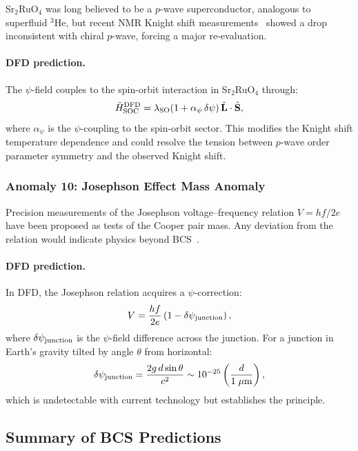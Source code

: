 \documentclass[aps,prb,twocolumn,superscriptaddress,floatfix,nofootinbib,longbibliography]{revtex4-2}
\begin{document}
Sr$_2$RuO$_4$ was long believed to be a $p$-wave superconductor,
analogous to superfluid $^3$He, but recent NMR Knight shift
measurements~\cite{Pustogow2019,Ishida2020} showed a drop inconsistent
with chiral $p$-wave, forcing a major re-evaluation.

\paragraph{DFD prediction.}
The $\psi$-field couples to the spin-orbit interaction in
Sr$_2$RuO$_4$ through:
\begin{equation}
\hat{H}_{\rm SOC}^{\rm DFD} = \lambda_{\rm SO}(1 + \alpha_\psi\,\delta\psi)
\,\hat{\mathbf{L}}\cdot\hat{\mathbf{S}},
\label{eq:sro-soc}
\end{equation}
where $\alpha_\psi$ is the $\psi$-coupling to the spin-orbit sector.
This modifies the Knight shift temperature dependence and could resolve
the tension between $p$-wave order parameter symmetry and the observed
Knight shift.

\subsubsection{Anomaly 10: Josephson Effect Mass Anomaly}

Precision measurements of the Josephson voltage--frequency relation
$V = hf/2e$ have been proposed as tests of the Cooper pair mass.  Any
deviation from the relation would indicate physics beyond
BCS~\cite{Kautz1996}.

\paragraph{DFD prediction.}
In DFD, the Josephson relation acquires a $\psi$-correction:
\begin{equation}
V = \frac{hf}{2e}\left(1 - \delta\psi_{\rm junction}\right),
\label{eq:josephson-psi}
\end{equation}
where $\delta\psi_{\rm junction}$ is the $\psi$-field difference across
the junction.  For a junction in Earth's gravity tilted by angle
$\theta$ from horizontal:
\begin{equation}
\delta\psi_{\rm junction} = \frac{2g\,d\sin\theta}{c^2}
\sim 10^{-25}\left(\frac{d}{1\;\mu\text{m}}\right),
\label{eq:josephson-grav}
\end{equation}
which is undetectable with current technology but establishes the
principle.

\subsection{Summary of BCS Predictions}
\end{document}
